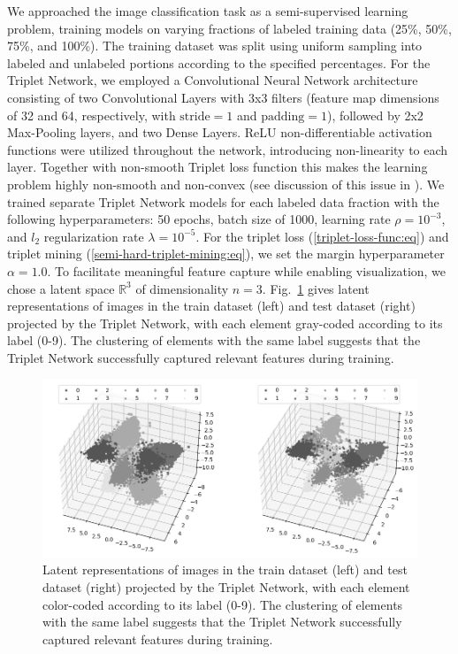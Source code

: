 We approached the image classification task as a semi-supervised learning problem, training models on varying fractions of labeled training data (25\%, 50\%, 75\%, and 100\%). The training dataset was split using uniform sampling into labeled and unlabeled portions according to the specified percentages. For the Triplet Network, we employed a Convolutional Neural Network architecture consisting of two Convolutional Layers with 3x3 filters (feature map dimensions of 32 and 64, respectively, with $\text{stride}=1$ and $\text{padding}=1$), followed by 2x2 Max-Pooling layers, and two Dense Layers. ReLU non-differentiable activation functions were utilized throughout the network, introducing non-linearity to each layer. Together with non-smooth Triplet loss function this makes the learning problem highly non-smooth and non-convex (see discussion of this issue in \cite{Norkin_2021}). We trained separate Triplet Network models for each labeled data fraction with the following hyperparameters: 50 epochs, batch size of 1000, learning rate $\rho = 10^{-3}$, and $l_2$ regularization rate $\lambda = 10^{-5}$. For the triplet loss (\ref{triplet-loss-func:eq}) and triplet mining (\ref{semi-hard-triplet-mining:eq}), we set the margin hyperparameter $\alpha = 1.0$. To facilitate meaningful feature capture while enabling visualization, we chose a latent space $\mathbb{R}^3$ of dimensionality $n=3$. Fig.~\ref{latent-space:fig} gives latent representations of images in the train dataset (left) and test dataset (right) projected by the Triplet Network, with each element gray-coded according to its label (0-9). The clustering of elements with the same label suggests that the Triplet Network successfully captured relevant features during training.

\begin{figure}
    \centering
    \includegraphics[width=\textwidth]{figures/latent_space.png}
    \caption{Latent representations of images in the train dataset (left) and test dataset (right) projected by the Triplet Network, with each element color-coded according to its label (0-9). The clustering of elements with the same label suggests that the Triplet Network successfully captured relevant features during training.}
    \label{latent-space:fig}
\end{figure}

